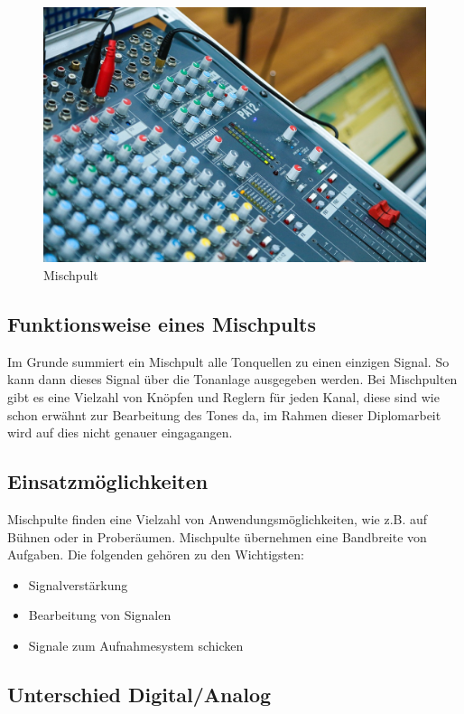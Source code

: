 \begin{figure}[H]
	\centering
	\includegraphics[width=0.8\linewidth]{images/mischpult.jpg}
	\caption[Mischpult]{Mischpult}
	\label{fig:Mischpult}
\end{figure}

\subsection{Funktionsweise eines Mischpults}
Im Grunde summiert ein Mischpult alle Tonquellen zu einen einzigen Signal. So kann dann dieses Signal über die Tonanlage ausgegeben werden. Bei Mischpulten gibt es eine Vielzahl von Knöpfen und Reglern für jeden Kanal, diese sind wie schon erwähnt zur Bearbeitung des Tones da, im Rahmen dieser Diplomarbeit wird auf dies nicht genauer eingagangen. \\
\textcite{MischpultErklaerung}

\subsection{Einsatzmöglichkeiten}
Mischpulte finden eine Vielzahl von Anwendungsmöglichkeiten, wie z.B. auf Bühnen oder in Proberäumen. Mischpulte übernehmen eine Bandbreite von Aufgaben. Die folgenden gehören zu den Wichtigsten:
\begin{itemize}
	\item Signalverstärkung
	\item Bearbeitung von Signalen
	\item Signale zum Aufnahmesystem schicken
\end{itemize}
\textcite{MischpultVerwendungszweck}

\subsection{Unterschied Digital/Analog}
